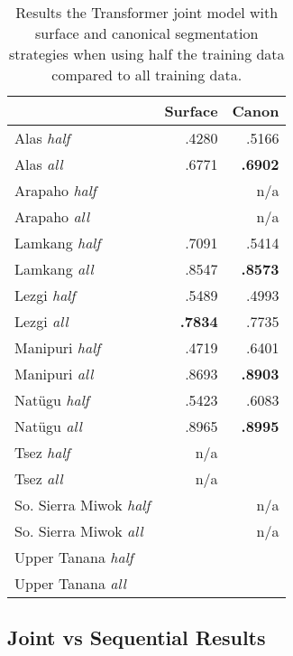 \begin{table}[h!]
    \centering
    \begin{tabular}{l|rr}
          & \textbf{Surface} & \textbf{Canon} \\
         \hline
         Alas \textit{half} & .4280 & .5166  \\
         Alas \textit{all} & .6771 & \textbf{.6902} \\
         \hline
         Arapaho \textit{half} &  & n/a \\
         Arapaho \textit{all} &  & n/a \\
         \hline
         Lamkang \textit{half} & .7091 & .5414  \\
         Lamkang \textit{all} & .8547 & \textbf{.8573} \\
         \hline
         Lezgi \textit{half} & .5489 & .4993  \\
         Lezgi \textit{all} & \textbf{.7834} & .7735 \\
         \hline
         Manipuri \textit{half} & .4719 & .6401   \\
         Manipuri \textit{all} & .8693 & \textbf{.8903} \\
         \hline
         Natügu \textit{half}  & .5423 & .6083  \\
         Natügu \textit{all} & .8965 & \textbf{.8995} \\
         \hline
         Tsez \textit{half} & n/a &  \\
         Tsez \textit{all} & n/a &  \\
         \hline
         So. Sierra Miwok \textit{half} &  & n/a \\
         So. Sierra Miwok \textit{all} &  & n/a \\
         \hline
         Upper Tanana \textit{half} &  &  \\
         Upper Tanana \textit{\textit{all}} &  &  \\
    \end{tabular}
    \caption[Results of Joint Segmentation and Glossing with Increased Data]{Results the Transformer joint model with surface and canonical segmentation strategies when using half the training data compared to all training data.}
    \label{tab:segsizeresults}
\end{table}


\subsection{Joint vs Sequential Results}

